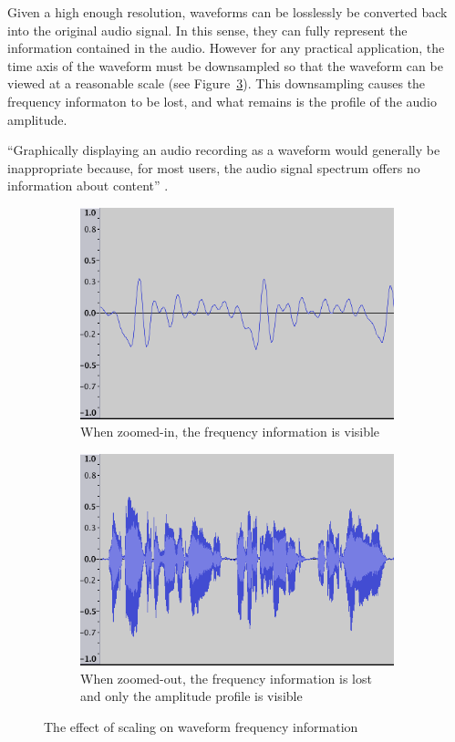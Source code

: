 Given a high enough resolution, waveforms can be losslessly be converted back into the original audio signal. In this
sense, they can fully represent the information contained in the audio. However for any practical application, the
time axis of the waveform must be downsampled so that the waveform can be viewed at a reasonable scale (see
Figure~\ref{fig:waveforms}).  This downsampling causes the frequency informaton to be lost, and what remains is the
profile of the audio amplitude.

``Graphically displaying an audio recording as a waveform would generally be inappropriate because, for most users, the
audio signal spectrum offers no information about content'' \citep{Bouamrane2007}.

\begin{figure}[p]
  \centering
  \begin{subfigure}{.5\textwidth}
    \centering
    \includegraphics[width=.9\linewidth]{figs/waveform-zoomin.png}
    \caption{When zoomed-in, the frequency information is visible}
    \label{fig:waveform-zoomin}
  \end{subfigure}%
  \begin{subfigure}{.5\textwidth}
    \centering
    \includegraphics[width=.9\linewidth]{figs/waveform-zoomout.png}
    \caption{When zoomed-out, the frequency information is lost and only the amplitude profile is visible}
    \label{fig:waveform-zoomout}
  \end{subfigure}
  \caption{The effect of scaling on waveform frequency information}
  \label{fig:waveforms}
\end{figure}

